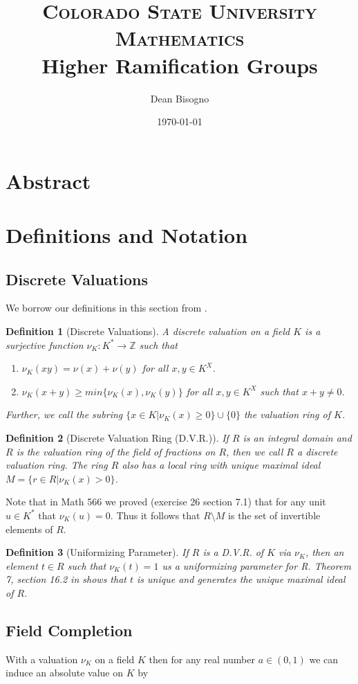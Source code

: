 \documentclass[paper=a4, fontsize=11pt]{scrartcl} %
\title{	
\normalfont \normalsize 
\textsc{Colorado State University Mathematics} \\ [25pt] %
\huge Higher Ramification Groups \\ %
}
\author{Dean Bisogno} %
\date{\normalsize\today} %
\numberwithin{equation}{section} %
\numberwithin{figure}{section} %
\numberwithin{table}{section} %
\theoremstyle{break}
\newtheorem{defn}{Definition}
\begin{document}
\maketitle %
\section{Abstract}
\section{Definitions and Notation}
\subsection{Discrete Valuations}
We borrow our definitions in this section from \cite{DnF}. 
\begin{defn}[Discrete Valuations]
A discrete valuation on a field $K$ is a surjective function $\nu_K: K^* \to \mathbb{Z}$ such that
\begin{enumerate}
\item $\nu_K(xy) = \nu(x) + \nu(y)$ for all $x,y\in K^X$.
\item $\nu_K(x+y) \geq min\{\nu_K(x),\nu_K(y)\}$ for all $x,y\in K^X$ such that $x+y \not= 0$.
\end{enumerate}
Further, we call the subring $\{x \in K|\nu_K(x) \geq 0\} \cup \{0\}$ the valuation ring of $K$.
\end{defn}
\begin{defn}[Discrete Valuation Ring (D.V.R.)]
If $R$ is an integral domain and $R$ is the valuation ring of the field of fractions on $R$, then we call $R$ a discrete valuation ring. The ring $R$ also has a local ring with unique maximal ideal $M=\{r \in R | \nu_K(x) > 0\}$.
\end{defn}
Note that in Math 566 we proved (exercise 26 section 7.1) that for any unit $u \in K^*$ that $\nu_K(u)=0$. Thus it follows that $R \setminus M$ is the set of invertible elements of $R$.
\begin{defn}[Uniformizing Parameter]
If $R$ is a D.V.R. of $K$ via $\nu_K$, then an element $t\in R$ such that $\nu_K(t) = 1$ us a uniformizing parameter for R. Theorem 7, section 16.2 in \cite{DnF} shows that $t$ is unique and generates the unique maximal ideal of $R$.
\end{defn}

\subsection{Field Completion}
With a valuation $\nu_K$ on a field $K$ then for any real number $a\in(0,1)$ we can induce an absolute value on $K$ by
\end{document}
